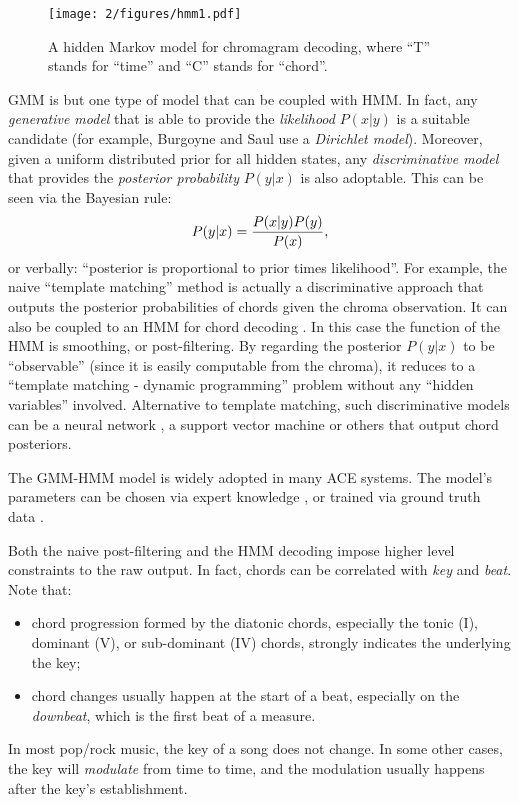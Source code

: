 \begin{figure}[htb]
\centering
\texttt{[image: 2/figures/hmm1.pdf]}
\caption{A hidden Markov model for chromagram decoding, where ``T'' stands for ``time'' and ``C'' stands for ``chord''.}
\label{fig:2-hmm1}
\end{figure}

GMM is but one type of model that can be coupled with HMM. In fact, any {\it generative model} that is able to provide the {\it likelihood} $P(x|y)$ is a suitable candidate (for example, Burgoyne and Saul \cite{burgoyne2005learning} use a \textit{Dirichlet model}). Moreover, given a uniform distributed prior for all hidden states, any {\it discriminative model} that provides the {\it posterior probability} $P(y|x)$ is also adoptable. This can be seen via the Bayesian rule:
\begin{equation}
P(y|x) = {P(x|y)P(y) \over P(x)},
\end{equation}
or verbally: ``posterior is proportional to prior times likelihood''. For example, the naive ``template matching'' method is actually a discriminative approach that outputs the posterior probabilities of chords given the chroma observation. It can also be coupled to an HMM for chord decoding \cite{ryynanen2008automatic}. In this case the function of the HMM is smoothing, or post-filtering. By regarding the posterior $P(y|x)$ to be ``observable'' (since it is easily computable from the chroma), it reduces to a ``template matching - dynamic programming'' problem without any ``hidden variables'' involved. Alternative to template matching, such discriminative models can be a neural network \cite{zhang2008chord}, a support vector machine \cite{weller2009structured} or others that output chord posteriors.

The GMM-HMM model is widely adopted in many ACE systems. The model's parameters can be chosen via expert knowledge \cite{bello2005robust,weil2008hmm,cannam2013mirex}, or trained via ground truth data \cite{ellis20072007,lee2008acoustic,weil2009automatic,khadkevich2009use,mauch2008discrete,reed2009minimum,cho2009real}.

Both the naive post-filtering and the HMM decoding impose higher level constraints to the raw output. In fact, chords can be correlated with {\it key} and {\it beat}. Note that:
\begin{itemize}
\item chord progression formed by the diatonic chords, especially the tonic (I), dominant (V), or sub-dominant (IV) chords, strongly indicates the underlying the key;
\item chord changes usually happen at the start of a beat, especially on the {\it downbeat}, which is the first beat of a measure.
\end{itemize}
In most pop/rock music, the key of a song does not change. In some other cases, the key will {\it modulate} from time to time, and the modulation usually happens after the key's establishment.

